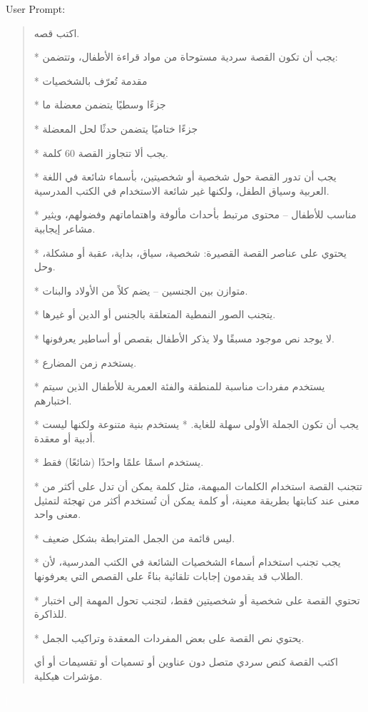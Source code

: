 \documentclass[11pt]{article}
\begin{document}
User Prompt:
\begin{quote}
\begin{Arabic}
اكتب قصه.

* يجب أن تكون القصة سردية مستوحاة من مواد قراءة الأطفال، وتتضمن:

* مقدمة تُعرّف بالشخصيات

* جزءًا وسطيًا يتضمن معضلة ما

* جزءًا ختاميًا يتضمن حدثًا لحل المعضلة

* يجب ألا تتجاوز القصة 60 كلمة.

* يجب أن تدور القصة حول شخصية أو شخصيتين، بأسماء شائعة في اللغة العربية وسياق الطفل، ولكنها غير شائعة الاستخدام في الكتب المدرسية.

* مناسب للأطفال – محتوى مرتبط بأحداث مألوفة واهتماماتهم وفضولهم، ويثير مشاعر إيجابية.

* يحتوي على عناصر القصة القصيرة: شخصية، سياق، بداية، عقبة أو مشكلة، وحل.

* متوازن بين الجنسين – يضم كلاً من الأولاد والبنات.

* يتجنب الصور النمطية المتعلقة بالجنس أو الدين أو غيرها.

* لا يوجد نص موجود مسبقًا ولا يذكر الأطفال بقصص أو أساطير يعرفونها.

* يستخدم زمن المضارع.

* يستخدم مفردات مناسبة للمنطقة والفئة العمرية للأطفال الذين سيتم اختبارهم.

* يجب أن تكون الجملة الأولى سهلة للغاية.
* يستخدم بنية متنوعة ولكنها ليست أدبية أو معقدة.

* يستخدم اسمًا علمًا واحدًا (شائعًا) فقط.

* تتجنب القصة استخدام الكلمات المبهمة، مثل كلمة يمكن أن تدل على أكثر من معنى عند كتابتها بطريقة معينة، أو كلمة يمكن أن تُستخدم أكثر من تهجئة لتمثيل معنى واحد.

* ليس قائمة من الجمل المترابطة بشكل ضعيف.

* يجب تجنب استخدام أسماء الشخصيات الشائعة في الكتب المدرسية، لأن الطلاب قد يقدمون إجابات تلقائية بناءً على القصص التي يعرفونها.

* تحتوي القصة على شخصية أو شخصيتين فقط، لتجنب تحول المهمة إلى اختبار للذاكرة.

* يحتوي نص القصة على بعض المفردات المعقدة وتراكيب الجمل.


اكتب القصة كنص سردي متصل دون عناوين أو تسميات أو تقسيمات أو أي مؤشرات هيكلية.
\end{Arabic}
\end{quote}

\textcolor{white}{|}\\
\end{document}

